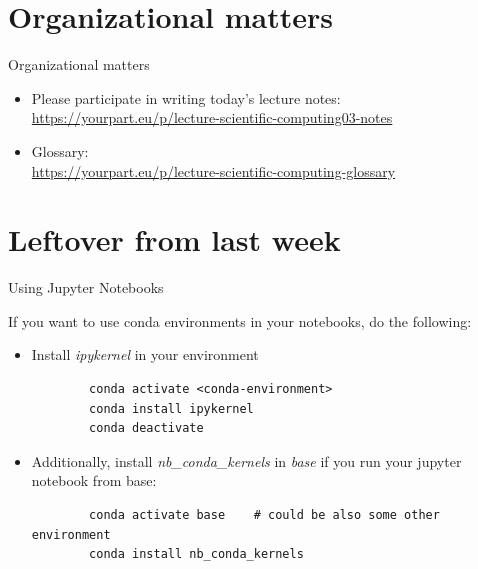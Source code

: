 
\subtitle{Start programming in Python}
\date{2020-04-02}


\begin{frame}
	\tableofcontents
\end{frame}

\section{Organizational matters}
\begin{frame}[fragile]{Organizational matters}
	\begin{itemize}
		\item Please participate in writing today's lecture notes:
            \href{https://yourpart.eu/p/lecture-scientific-computing03-notes}{https://yourpart.eu/p/lecture-scientific-computing03-notes}\pause
        \item Glossary:\\
            \href{https://yourpart.eu/p/lecture-scientific-computing-glossary}{https://yourpart.eu/p/lecture-scientific-computing-glossary}
	\end{itemize}
\end{frame}

\section{Leftover from last week}

\begin{frame}[fragile]{Using Jupyter Notebooks}
	
	If you want to use conda environments in your notebooks, do the following:
	\begin{itemize}
		\item Install \textit{ipykernel} in your environment
		
		\begin{verbatim}
		conda activate <conda-environment>
		conda install ipykernel
		conda deactivate
		\end{verbatim}
		\item Additionally, install \textit{nb\_conda\_kernels} in \textit{base} if you run your jupyter notebook from base:
		\begin{verbatim}
		conda activate base    # could be also some other environment
		conda install nb_conda_kernels
		\end{verbatim}
	\end{itemize}
\end{frame}

